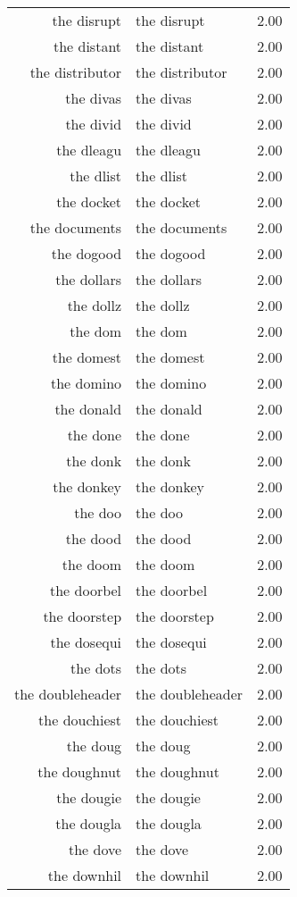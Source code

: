 \begin{table}[ht]
\begin{tabular}{rlr}
  the disrupt & the disrupt & 2.00 \\ 
  the distant & the distant & 2.00 \\ 
  the distributor & the distributor & 2.00 \\ 
  the divas & the divas & 2.00 \\ 
  the divid & the divid & 2.00 \\ 
  the dleagu & the dleagu & 2.00 \\ 
  the dlist & the dlist & 2.00 \\ 
  the docket & the docket & 2.00 \\ 
  the documents & the documents & 2.00 \\ 
  the dogood & the dogood & 2.00 \\ 
  the dollars & the dollars & 2.00 \\ 
  the dollz & the dollz & 2.00 \\ 
  the dom & the dom & 2.00 \\ 
  the domest & the domest & 2.00 \\ 
  the domino & the domino & 2.00 \\ 
  the donald & the donald & 2.00 \\ 
  the done & the done & 2.00 \\ 
  the donk & the donk & 2.00 \\ 
  the donkey & the donkey & 2.00 \\ 
  the doo & the doo & 2.00 \\ 
  the dood & the dood & 2.00 \\ 
  the doom & the doom & 2.00 \\ 
  the doorbel & the doorbel & 2.00 \\ 
  the doorstep & the doorstep & 2.00 \\ 
  the dosequi & the dosequi & 2.00 \\ 
  the dots & the dots & 2.00 \\ 
  the doubleheader & the doubleheader & 2.00 \\ 
  the douchiest & the douchiest & 2.00 \\ 
  the doug & the doug & 2.00 \\ 
  the doughnut & the doughnut & 2.00 \\ 
  the dougie & the dougie & 2.00 \\ 
  the dougla & the dougla & 2.00 \\ 
  the dove & the dove & 2.00 \\ 
  the downhil & the downhil & 2.00 \\ 

\end{tabular}
\end{table}

